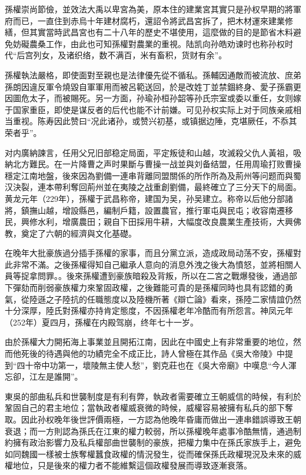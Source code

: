 孫權崇尚節儉，並效法大禹以卑宮為美，原本住的建業宮其實只是孙权早期的將軍府而已，一直住到赤烏十年建材腐朽，還詔令將武昌宮拆了，把木材運來建業修繕，但其實當時武昌宮也有二十八年的歷史不堪使用，這麼做的目的是節省木料避免妨礙農桑工作，由此也可知孫權對農業的重視。陆凯向孙皓劝谏时也称孙权时代“后宫列女，及诸织络，数不满百，米有畜积，货财有余”。

孫權執法嚴格，即使面對至親也是法律優先從不循私。孫輔因通敵而被流放、庶弟孫朗因違反軍令燒毀自軍軍用而被呂範送回，於是改姓丁並禁錮終身、愛子孫霸更因圖危太子，而被賜死。另一方面，孙瑜孙桓孙韶等孙氏宗室或委以重任，女则嫁于国家重臣，即使是谋反者的后代也能不计前嫌。可见孙权实际上对于同族亲戚相当重视。陈寿因此赞曰“况此诸孙，或赞兴初基，或镇据边陲，克堪厥任，不忝其荣者乎”。

对内廣納諫言，任用父兄旧部稳定局面，平定叛徒和山越，攻滅殺父仇人黃祖，吸納北方難民。在一片降曹之声时果斷与曹操一战並與刘备结盟，任用周瑜打败曹操穩定江南地盤，後來因為劉備一連串背離同盟關係的所作所為及荊州等问题而與蜀汉決裂，連本帶利奪回荊州並在夷陵之战重創劉備，最終確立了三分天下的局面。黄龙元年（229年），孫權于武昌称帝，建国为吴，孙吴建立。称帝以后他分部諸將，鎮撫山越，增設縣邑，編制戶籍，設置農官，推行軍屯與民屯；收容南遷移民，興修水利，增廣農田；親自下田採用牛耕，大幅度改良農業生產技術，大興佛教，奠定了六朝的經濟與文化基礎。

在晚年大批豪族過分插手孫權的家事，而且分黨立派，造成政局动荡不安，孫權對此非常不滿。之後孫權得知自己繼承人意向的消息外洩之後大為憤怒，並將相關人員等捉拿問罪。。後來孫權遭到豪族暗殺及背叛，所以在二宮之戰爆發後，通過部下彈劾而削弱豪族權力來鞏固政權，之後難能可貴的是孫權同時也具有認錯的勇氣，從陸遜之子陸抗的任職態度以及陸機所著《辯亡論》看來，孫陸二家情誼仍然十分深厚，陸氏對孫權亦持肯定態度，不因孫權老年冷酷而有所怨言。神凤元年（252年）夏四月，孫權在内殿驾崩，终年七十一岁。

由於孫權大力開拓海上事業並且開拓江南，因此在中國史上有非常重要的地位，然而他死後的待遇與他的功績完全不成正比，詩人曾極在其作品《吳大帝陵》中提到“四十帝中功第一，壞陵無主使人愁”，劉克莊也在《吳大帝廟》中嘆息“今人渾忘卻，江左是誰開”。

東吳的部曲私兵和世襲制度是有利有弊，執政者需要確立王朝威信的時候，有利於鞏固自己的君主地位；當執政者權威衰微的時候，威權容易被擁有私兵的部下奪取。因此孙权晚年後世評價兩極，一方認為他晚年昏庸而做出一連串錯誤導致王朝衰退；而一方則認為孫氏在江東的權力較弱，所以孫權晚年處事冷酷無情，通過制約擁有政治影響力及私兵權部曲世襲制的豪族，把權力集中在孫氏家族手上，避免如同魏國一樣被士族奪權蠶食政權的情況發生，從而確保孫氏政權現況及未來的威權地位，只是後來的權力者不能維繫這個政權發展而導致逐漸衰落。

